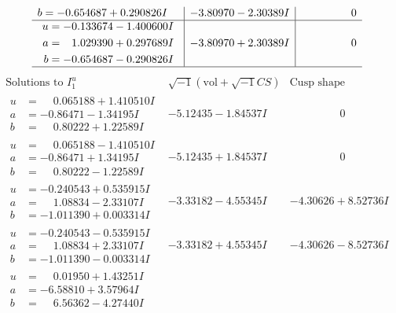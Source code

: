 \documentclass[1p]{elsarticle_modified}
\theoremstyle{definition}
\newcommand{\I}{\sqrt{-1}}
\begin{document}
$$\begin{array}{c|c|c}
\begin{aligned}
b &= -0.654687 + 0.290826 I\end{aligned}
 & -3.80970 - 2.30389 I & \phantom{-0.000000 } 0 \\ \hline\begin{aligned}
u &= -0.133674 - 1.400600 I \\
a &= \phantom{-}1.029390 + 0.297689 I \\
b &= -0.654687 - 0.290826 I\end{aligned}
 & -3.80970 + 2.30389 I & \phantom{-0.000000 } 0\\
 \hline 
 \end{array}$$\newpage$$\begin{array}{c|c|c}  
\text{Solutions to }I^u_{1}& \I (\text{vol} + \sqrt{-1}CS) & \text{Cusp shape}\\
 \hline 
\begin{aligned}
u &= \phantom{-}0.065188 + 1.410510 I \\
a &= -0.86471 - 1.34195 I \\
b &= \phantom{-}0.80222 + 1.22589 I\end{aligned}
 & -5.12435 - 1.84537 I & \phantom{-0.000000 } 0 \\ \hline\begin{aligned}
u &= \phantom{-}0.065188 - 1.410510 I \\
a &= -0.86471 + 1.34195 I \\
b &= \phantom{-}0.80222 - 1.22589 I\end{aligned}
 & -5.12435 + 1.84537 I & \phantom{-0.000000 } 0 \\ \hline\begin{aligned}
u &= -0.240543 + 0.535915 I \\
a &= \phantom{-}1.08834 - 2.33107 I \\
b &= -1.011390 + 0.003314 I\end{aligned}
 & -3.33182 - 4.55345 I & -4.30626 + 8.52736 I \\ \hline\begin{aligned}
u &= -0.240543 - 0.535915 I \\
a &= \phantom{-}1.08834 + 2.33107 I \\
b &= -1.011390 - 0.003314 I\end{aligned}
 & -3.33182 + 4.55345 I & -4.30626 - 8.52736 I \\ \hline\begin{aligned}
u &= \phantom{-}0.01950 + 1.43251 I \\
a &= -6.58810 + 3.57964 I \\
b &= \phantom{-}6.56362 - 4.27440 I\end{aligned}

\end{array}$$
\end{document}
